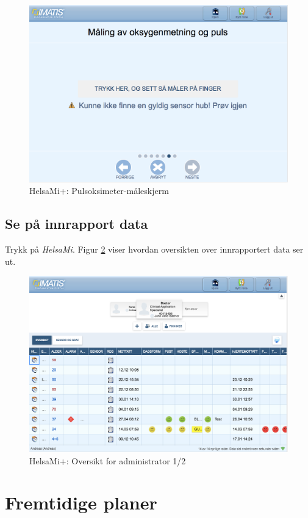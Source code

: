 \begin{figure}
\includegraphics[width=1.0\textwidth,center]{fig/helsami/pulsoksimeter_maaling}
\caption{HelsaMi+: Pulsoksimeter-måleskjerm}
\label{fig:helsami_pulsoksimeter_maaling}
\end{figure}

\subsection{Se på innrapport data}
Trykk på \textit{HelsaMi}. Figur \ref{fig:helsami_admin1} viser hvordan oversikten over innrapportert data ser ut.

\begin{figure}
\includegraphics[width=1.0\textwidth,center]{fig/helsami/admin_oversikt}
\caption{HelsaMi+: Oversikt for administrator 1/2}
\label{fig:helsami_admin1}
\end{figure}

\section{Fremtidige planer}
